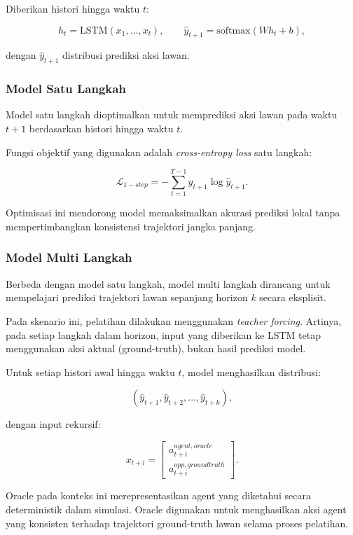 Diberikan histori hingga waktu $t$:

\[
h_t = \text{LSTM}(x_1, \dots, x_t),
\qquad
\hat{y}_{t+1} = \text{softmax}(W h_t + b),
\]

dengan $\hat{y}_{t+1}$ distribusi prediksi aksi lawan.

\subsubsection{Model Satu Langkah}

Model satu langkah dioptimalkan untuk memprediksi aksi lawan pada waktu $t+1$ berdasarkan histori hingga waktu $t$.

Fungsi objektif yang digunakan adalah \textit{cross-entropy loss} satu langkah:

\[
\mathcal{L}_{1-step}
=
-
\sum_{t=1}^{T-1}
y_{t+1}
\log
\hat{y}_{t+1}.
\]

Optimisasi ini mendorong model memaksimalkan akurasi prediksi lokal tanpa mempertimbangkan konsistensi trajektori jangka panjang.

\subsubsection{Model Multi Langkah}

Berbeda dengan model satu langkah, model multi langkah dirancang untuk mempelajari prediksi trajektori lawan sepanjang horizon $k$ secara eksplisit.

Pada skenario ini, pelatihan dilakukan menggunakan \textit{teacher forcing}. Artinya, pada setiap langkah dalam horizon, input yang diberikan ke LSTM tetap menggunakan aksi aktual (ground-truth), bukan hasil prediksi model.

Untuk setiap histori awal hingga waktu $t$, model menghasilkan distribusi:

\[
(\hat{y}_{t+1}, \hat{y}_{t+2}, \dots, \hat{y}_{t+k}),
\]

dengan input rekursif:

\[
x_{t+i} =
\begin{bmatrix}
a_{t+i}^{agent, oracle} \\
a_{t+i}^{opp, groundtruth}
\end{bmatrix}.
\]

Oracle pada konteks ini merepresentasikan agent yang diketahui secara deterministik dalam simulasi. Oracle digunakan untuk menghasilkan aksi agent yang konsisten terhadap trajektori ground-truth lawan selama proses pelatihan.

